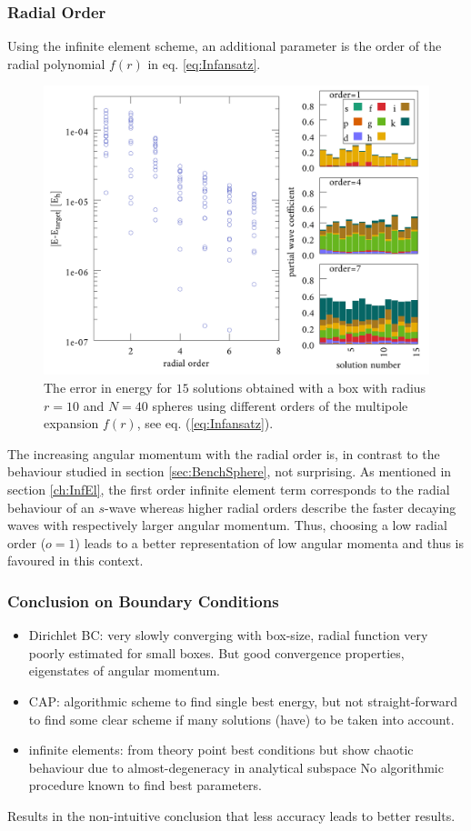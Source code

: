 \subsubsection{Radial Order}
Using the infinite element scheme, an additional parameter is the order of the radial polynomial $f(r)$ in eq. \ref{eq:Infansatz}.
\begin{figure}
\includegraphics[width=\textwidth]{Figures/BC/OrdInfEL}
\caption{The error in energy for $15$ solutions obtained with a box with radius $r=10$ and $N=40$ spheres using different orders of the multipole expansion $f(r)$, see eq. (\ref{eq:Infansatz}).}
\label{fig:InfOrd}
\end{figure}
The increasing angular momentum with the radial order is, in contrast to the behaviour studied in section \ref{sec:BenchSphere}, not surprising.
As mentioned in section \ref{ch:InfEl}, the  first order infinite element term corresponds to the radial behaviour of an $s$-wave whereas higher radial orders describe the faster decaying waves with respectively larger angular momentum.
Thus, choosing a low radial order ($o=1$) leads to a better representation of low angular momenta and thus is favoured in this context.

\subsubsection{Conclusion on Boundary Conditions}
\begin{itemize}
  \item Dirichlet BC: very slowly converging with box-size, radial function very poorly estimated for small boxes.
       But good convergence properties, eigenstates of angular momentum.
  \item CAP: algorithmic scheme to find single best energy, but not straight-forward to find some clear scheme if many solutions (have) to be taken into account.
  \item infinite elements: from theory point best conditions but show chaotic behaviour due to almost-degeneracy in analytical subspace No algorithmic procedure known to find best parameters.
\end{itemize}
Results in the non-intuitive conclusion that less accuracy leads to better results.

